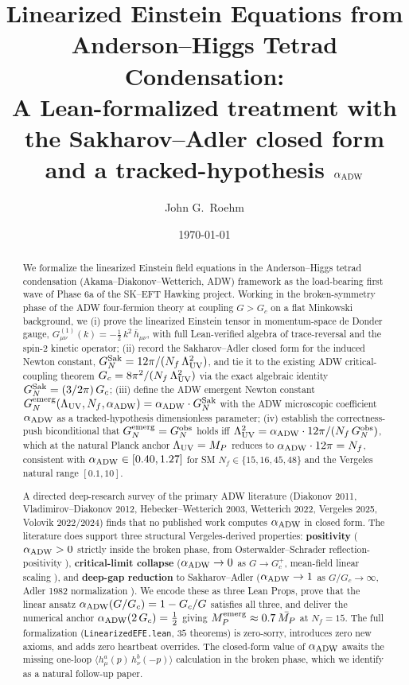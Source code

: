 \documentclass[aps,prd,twocolumn,showpacs,superscriptaddress,nofootinbib]{revtex4-2}
\newcommand{\GNobs}{G_{N}^{\rm obs}}
\newcommand{\GNemerg}{G_{N}^{\rm emerg}}
\newcommand{\GNsak}{G_{N}^{\rm Sak}}
\newcommand{\Lambdauv}{\Lambda_{\rm UV}}
\newcommand{\Mpl}{M_{P}}
\newcommand{\Nf}{N_{f}}
\newcommand{\aADW}{\alpha_{\rm ADW}}
\newcommand{\Gc}{G_{c}}
\begin{document}
\title{Linearized Einstein Equations from Anderson--Higgs Tetrad Condensation:\\
A Lean-formalized treatment with the Sakharov--Adler closed form
and a tracked-hypothesis $\aADW$}

\author{John G.\ Roehm}

\date{\today}

\begin{abstract}
We formalize the linearized Einstein field equations in the Anderson--Higgs
tetrad condensation (Akama--Diakonov--Wetterich, ADW) framework as the
load-bearing first wave of Phase 6a of the SK--EFT Hawking project. Working
in the broken-symmetry phase of the ADW four-fermion theory at coupling
$G > \Gc$ on a flat Minkowski background, we (i) prove the linearized
Einstein tensor in momentum-space de Donder gauge,
$G^{(1)}_{\mu\nu}(k) = -\tfrac{1}{2}\,k^{2}\,\bar{h}_{\mu\nu}$, with full
Lean-verified algebra of trace-reversal and the spin-2 kinetic operator;
(ii) record the Sakharov--Adler closed form for the induced Newton constant,
$\GNsak = 12\pi/(\Nf\,\Lambdauv^{2})$, and tie it to the existing ADW
critical-coupling theorem $\Gc = 8\pi^{2}/(\Nf\,\Lambdauv^{2})$ via the
exact algebraic identity $\GNsak = (3/2\pi)\,\Gc$; (iii) define the
ADW emergent Newton constant
$\GNemerg(\Lambdauv,\Nf,\aADW) = \aADW \cdot \GNsak$ with the
ADW microscopic coefficient $\aADW$ as a tracked-hypothesis
dimensionless parameter; (iv) establish the correctness-push biconditional
that $\GNemerg = \GNobs$ holds iff
$\Lambdauv^{2} = \aADW \cdot 12\pi/(\Nf\,\GNobs)$, which at the natural
Planck anchor $\Lambdauv = \Mpl$ reduces to $\aADW \cdot 12\pi = \Nf$,
consistent with $\aADW \in [0.40,1.27]$ for SM $\Nf \in \{15,16,45,48\}$
and the Vergeles natural range $[0.1,10]$.

A directed deep-research survey of the primary ADW literature
(Diakonov 2011, Vladimirov--Diakonov 2012, Hebecker--Wetterich 2003,
Wetterich 2022, Vergeles 2025, Volovik 2022/2024) finds that no published
work computes $\aADW$ in closed form. The literature does support three
structural Vergeles-derived properties:
\textbf{positivity} ($\aADW > 0$ strictly inside the broken phase, from
Osterwalder--Schrader reflection-positivity \cite{Vergeles2025}),
\textbf{critical-limit collapse} ($\aADW \to 0$ as $G \to \Gc^{+}$,
mean-field linear scaling \cite{VladimirovDiakonov2012}), and
\textbf{deep-gap reduction} to Sakharov--Adler ($\aADW \to 1$ as
$G/\Gc \to \infty$, Adler 1982 normalization \cite{Adler1982}).
We encode these as three Lean Props, prove that the linear
ansatz $\aADW(G/\Gc) = 1 - \Gc/G$ satisfies all three, and deliver
the numerical anchor $\aADW(2\,\Gc) = \tfrac{1}{2}$ giving
$\Mpl^{\rm emerg} \approx 0.7\,\bar{\Mpl}$ at $\Nf=15$.
The full formalization (\texttt{LinearizedEFE.lean},
$35$ theorems) is zero-sorry, introduces zero new axioms, and adds zero
heartbeat overrides. The closed-form value of $\aADW$ awaits the
missing one-loop $\langle h^{a}_{\mu}(p)\,h^{b}_{\nu}(-p)\rangle$
calculation in the broken phase, which we identify as a natural
follow-up paper.
\end{abstract}
\end{document}
